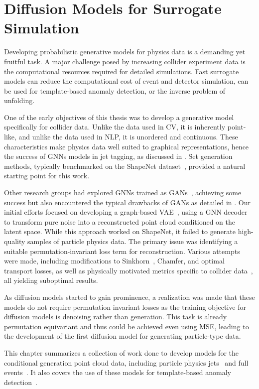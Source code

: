 \chapter{Diffusion Models for Surrogate Simulation}

Developing probabilistic generative models for physics data is a demanding yet fruitful task.
A major challenge posed by increasing collider experiment data is the computational resources required for detailed simulations.
Fast surrogate models can reduce the computational cost of event and detector simulation, can be used for template-based anomaly detection, or the inverse problem of unfolding.

One of the early objectives of this thesis was to develop a generative model specifically for collider data.
Unlike the data used in CV, it is inherently point-like, and unlike the data used in NLP, it is unordered and continuous.
These characteristics make physics data well suited to graphical representations, hence the success of GNNs models in jet tagging, as discussed in .
Set generation methods, typically benchmarked on the ShapeNet dataset~\cite{ShapeNet}, provided a natural starting point for this work.

Other research groups had explored GNNs trained as GANs~\cite{MPGAN}, achieving some success but also encountered the typical drawbacks of GANs as detailed in .
Our initial efforts focused on developing a graph-based VAE~\cite{SetVAE}, using a GNN decoder to transform pure noise into a reconstructed point cloud conditioned on the latent space.
While this approach worked on ShapeNet, it failed to generate high-quality samples of particle physics data.
The primary issue was identifying a suitable permutation-invariant loss term for reconstruction. Various attempts were made, including modifications to Sinkhorn~\cite{Sinkhorn}, Chamfer, and optimal transport losses, as well as physically motivated metrics specific to collider data~\cite{MetricSpaceCollider}, all yielding suboptimal results.

As diffusion models started to gain prominence, a realization was made that these models do not require permutation invariant losses as the training objective for diffusion models is denoising rather than generation.
This task is already permutation equivariant and thus could be achieved even using MSE, leading to the development of the first diffusion model for generating particle-type data.

This chapter summarizes a collection of work done to develop models for the conditional generation point cloud data, including particle physics jets~\cite{PCJedi, EpicJedi, PCDroid} and full events~\cite{PIPPIN}.
It also covers the use of these models for template-based anomaly detection~\cite{Drapes, RadOT}.

